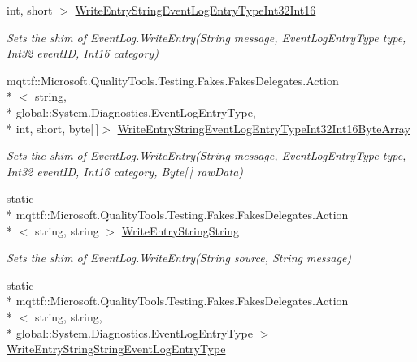 \begin{DoxyCompactItemize}
int, short $>$ \hyperlink{class_system_1_1_diagnostics_1_1_fakes_1_1_shim_event_log_ab207df1f6bf821f374b84a83e931aa1f}{Write\-Entry\-String\-Event\-Log\-Entry\-Type\-Int32\-Int16}
\begin{DoxyCompactList}\small\item\em Sets the shim of Event\-Log.\-Write\-Entry(\-String message, Event\-Log\-Entry\-Type type, Int32 event\-I\-D, Int16 category)\end{DoxyCompactList}\item 
mqttf\-::\-Microsoft.\-Quality\-Tools.\-Testing.\-Fakes.\-Fakes\-Delegates.\-Action\\*
$<$ string, \\*
global\-::\-System.\-Diagnostics.\-Event\-Log\-Entry\-Type, \\*
int, short, byte\mbox{[}$\,$\mbox{]}$>$ \hyperlink{class_system_1_1_diagnostics_1_1_fakes_1_1_shim_event_log_aaaa284abcdd1284cef19190278427598}{Write\-Entry\-String\-Event\-Log\-Entry\-Type\-Int32\-Int16\-Byte\-Array}
\begin{DoxyCompactList}\small\item\em Sets the shim of Event\-Log.\-Write\-Entry(\-String message, Event\-Log\-Entry\-Type type, Int32 event\-I\-D, Int16 category, Byte\mbox{[}$\,$\mbox{]} raw\-Data)\end{DoxyCompactList}\item 
static \\*
mqttf\-::\-Microsoft.\-Quality\-Tools.\-Testing.\-Fakes.\-Fakes\-Delegates.\-Action\\*
$<$ string, string $>$ \hyperlink{class_system_1_1_diagnostics_1_1_fakes_1_1_shim_event_log_a9dee6ea75ff44d6685a32bbd77bb4b8b}{Write\-Entry\-String\-String}
\begin{DoxyCompactList}\small\item\em Sets the shim of Event\-Log.\-Write\-Entry(\-String source, String message)\end{DoxyCompactList}\item 
static \\*
mqttf\-::\-Microsoft.\-Quality\-Tools.\-Testing.\-Fakes.\-Fakes\-Delegates.\-Action\\*
$<$ string, string, \\*
global\-::\-System.\-Diagnostics.\-Event\-Log\-Entry\-Type $>$ \hyperlink{class_system_1_1_diagnostics_1_1_fakes_1_1_shim_event_log_af02b7a37a61cc2be6038ae1dd53c4a2d}{Write\-Entry\-String\-String\-Event\-Log\-Entry\-Type}

\end{DoxyCompactItemize}
